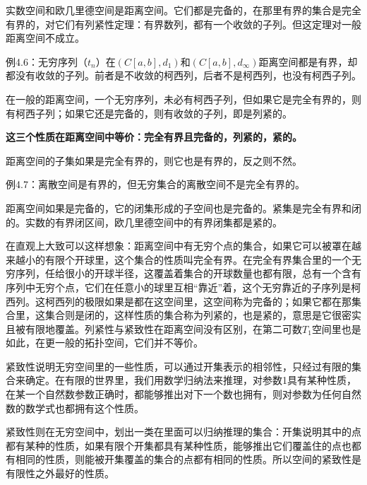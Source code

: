 实数空间和欧几里德空间是距离空间。它们都是完备的，在那里有界的集合是完全有界的，对它们有列紧性定理：有界数列，都有一个收敛的子列。但这定理对一般距离空间不成立。

\kaishu
\setlength{\leftskip}{1em}

例4.6：无穷序列（$ t_n $）在$ (C[a,b],d_1) $和$ (C[a,b],d_\infty) $距离空间都是有界，却都没有收敛的子列。前者是不收敛的柯西列，后者不是柯西列，也没有柯西子列。

\songti
\setlength{\leftskip}{0em}

在一般的距离空间，一个无穷序列，未必有柯西子列，但如果它是完全有界的，则有柯西子列；如果它还是完备的，则有收敛的子列，即是列紧的。

\kaishu

\textbf{这三个性质在距离空间中等价：完全有界且完备的，列紧的，紧的。}

\songti

距离空间的子集如果是完全有界的，则它也是有界的，反之则不然。

\kaishu
\setlength{\leftskip}{1em}

例4.7：离散空间是有界的，但无穷集合的离散空间不是完全有界的。

\songti
\setlength{\leftskip}{0em}

距离空间如果是完备的，它的闭集形成的子空间也是完备的。紧集是完全有界和闭的。实数的有界闭区间，欧几里德空间中的有界闭集都是紧的。

在直观上大致可以这样想象：距离空间中有无穷个点的集合，如果它可以被罩在越来越小的有限个开球里，这个集合的性质叫完全有界。在完全有界集合里的一个无穷序列，任给很小的开球半径，这覆盖着集合的开球数量也都有限，总有一个含有序列中无穷个点，它们在任意小的球里互相``靠近''着，这个无穷靠近的子序列是柯西列。这柯西列的极限如果是都在这空间里，这空间称为完备的；如果它都在那集合里，这集合则是闭的，这样性质的集合称为列紧的，也是紧的，意思是它很密实且被有限地覆盖。列紧性与紧致性在距离空间没有区别，在第二可数$ T_1 $空间里也是如此，在更一般的拓扑空间，它们并不等价。

紧致性说明无穷空间里的一些性质，可以通过开集表示的相邻性，只经过有限的集合来确定。在有限的世界里，我们用数学归纳法来推理，对参数1具有某种性质，在某一个自然数参数正确时，都能够推出对下一个数也拥有，则对参数为任何自然数的数学式也都拥有这个性质。

紧致性则在无穷空间中，划出一类在里面可以归纳推理的集合：开集说明其中的点都有某种的性质，如果有限个开集都具有某种性质，能够推出它们覆盖住的点也都有相同的性质，则能被开集覆盖的集合的点都有相同的性质。所以空间的紧致性是有限性之外最好的性质。

